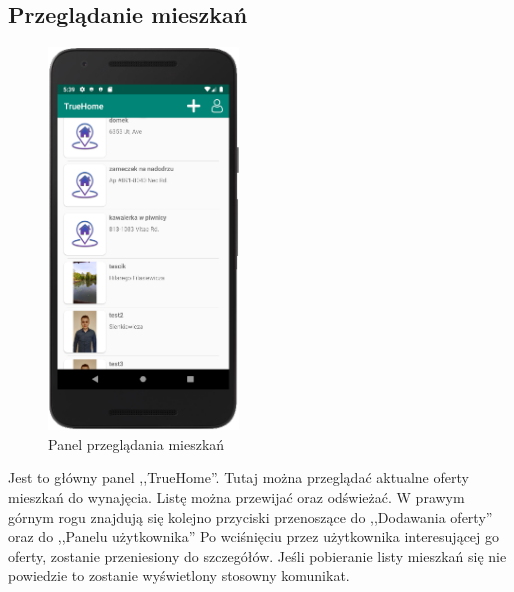 \documentclass[polish, 11pt]{article}
\begin{document}
     \subsection{Przeglądanie mieszkań}
        \begin{figure}[H]
                    \centering
                    \includegraphics[width=0.45\textwidth]{aplikacja/main.png}
                    \caption{Panel przeglądania mieszkań}
        \end{figure}
        
       Jest to główny panel ,,TrueHome''. Tutaj można przeglądać aktualne oferty mieszkań do wynajęcia. Listę można przewijać oraz odświeżać. W prawym górnym rogu znajdują się kolejno przyciski przenoszące do ,,Dodawania oferty'' oraz do ,,Panelu użytkownika'' Po wciśnięciu przez użytkownika interesującej go oferty, zostanie przeniesiony do szczegółów. Jeśli pobieranie listy mieszkań się nie powiedzie to zostanie wyświetlony stosowny komunikat.
\end{document}
